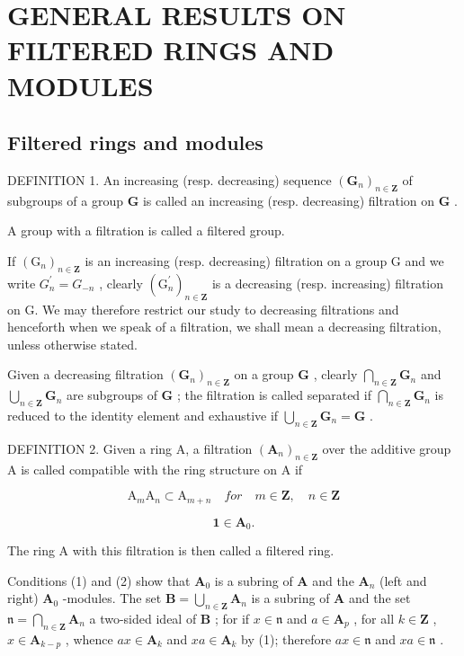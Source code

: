 \section{GENERAL RESULTS ON FILTERED RINGS AND MODULES}

\subsection{Filtered rings and modules}

DEFINITION 1. An increasing (resp. decreasing) sequence \((\mathbf{G}_n)_{n\in \mathbf{Z}}\) of subgroups of a group \(\mathbf{G}\) is called an increasing (resp. decreasing) filtration on \(\mathbf{G}\) .

A group with a filtration is called a filtered group.

If \((\mathrm{G}_{n})_{n\in\mathbf{Z}}\) is an increasing (resp. decreasing) filtration on a group G and we write \(G_{n}^{\prime}=G_{-n}\) , clearly \((\mathrm{G}_{n}^{\prime})_{n\in\mathbf{Z}}\) is a decreasing (resp. increasing) filtration on G. We may therefore restrict our study to decreasing filtrations and henceforth when we speak of a filtration, we shall mean a decreasing filtration, unless otherwise stated.

Given a decreasing filtration \((\mathbf{G}_n)_{n\in \mathbf{Z}}\) on a group \(\mathbf{G}\) , clearly \(\bigcap_{n\in \mathbf{Z}}\mathbf{G}_n\) and \(\bigcup_{n\in \mathbf{Z}}\mathbf{G}_n\) are subgroups of \(\mathbf{G}\) ; the filtration is called separated if \(\bigcap_{n\in \mathbf{Z}}\mathbf{G}_n\) is reduced to the identity element and exhaustive if \(\bigcup_{n\in \mathbf{Z}}\mathbf{G}_n = \mathbf{G}\) .

DEFINITION 2. Given a ring A, a filtration \((\mathbf{A}_n)_{n\in \mathbf{Z}}\) over the additive group A is called compatible with the ring structure on A if

\[
\mathrm{A} _ {m} \mathrm{A} _ {n} \subset \mathrm{A} _ {m + n} \quad for \quad m \in \mathbf {Z}, \quad n \in \mathbf {Z}\tag{1}
\]

\[
\mathbf {1} \in \mathbf {A} _ {0}.\tag{2}
\]

The ring A with this filtration is then called a filtered ring.

Conditions (1) and (2) show that \(\mathbf{A}_0\) is a subring of \(\mathbf{A}\) and the \(\mathbf{A}_n\) (left and right) \(\mathbf{A}_0\) -modules. The set \(\mathbf{B} = \bigcup_{n \in \mathbf{Z}} \mathbf{A}_n\) is a subring of \(\mathbf{A}\) and the set \(\mathfrak{n} = \bigcap_{n \in \mathbf{Z}} \mathbf{A}_n\) a two-sided ideal of \(\mathbf{B}\) ; for if \(x \in \mathfrak{n}\) and \(a \in \mathbf{A}_p\) , for all \(k \in \mathbf{Z}\) , \(x \in \mathbf{A}_{k-p}\) , whence \(ax \in \mathbf{A}_k\) and \(xa \in \mathbf{A}_k\) by (1); therefore \(ax \in \mathfrak{n}\) and \(xa \in \mathfrak{n}\) .

